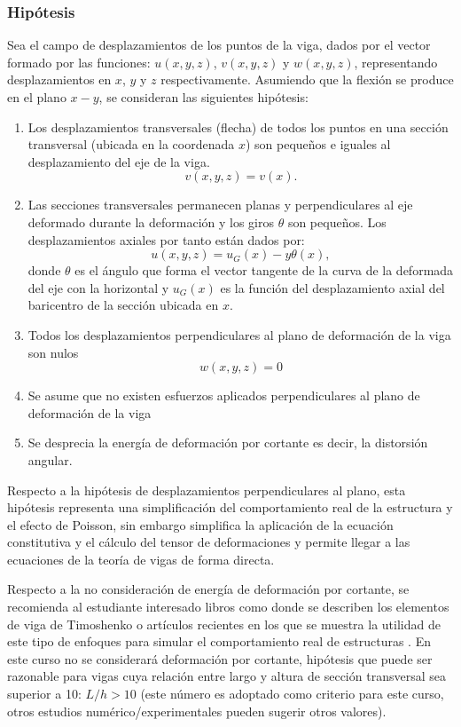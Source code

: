 \subsubsection{Hipótesis}
Sea el campo de desplazamientos de los puntos de la viga, dados por el vector formado por las funciones: $u(x,y,z)$, $v(x,y,z)$ y $w(x,y,z)$, representando desplazamientos en $x$, $y$ y $z$ respectivamente. %
%
Asumiendo que la flexión se produce en el plano $x-y$, se consideran las siguientes hipótesis:
%
\begin{enumerate}
	\item Los desplazamientos transversales (flecha) de todos los puntos en una sección transversal (ubicada en la coordenada $x$)  son pequeños e iguales al desplazamiento del eje de la viga.
	$$
	v(x,y,z) =  v(x).
	$$
	\item Las secciones transversales permanecen planas y perpendiculares al eje deformado durante la deformación y los giros $\theta$ son pequeños. %
	Los desplazamientos axiales por tanto están dados por:
	\begin{equation} \label{eqn:despaxi}
	u(x,y,z) = u_G(x) - y \theta(x),
	\end{equation}
	donde $\theta$ es el ángulo que forma el vector tangente de la curva de la deformada del eje con la horizontal y $u_G(x)$ es la función del desplazamiento axial del baricentro de la sección ubicada en $x$. 
	\item Todos los desplazamientos perpendiculares al plano de deformación de la viga son nulos
$$
w(x,y,z) = 0
$$
	\item Se asume que no existen esfuerzos aplicados perpendiculares al plano de deformación de la viga
	\item Se desprecia la energía de deformación por cortante es decir, la distorsión angular.
\end{enumerate}

Respecto a la hipótesis de desplazamientos perpendiculares al plano, esta hipótesis representa una simplificación del comportamiento real de la estructura y el efecto de Poisson, sin embargo simplifica la aplicación de la ecuación constitutiva y el cálculo del tensor de deformaciones y permite llegar a las ecuaciones de la teoría de vigas de forma directa.

Respecto a la no consideración de energía de deformación por cortante, se recomienda al estudiante interesado libros como \citep{Onate2013} donde se describen los elementos de viga de Timoshenko o  artículos recientes en los que se muestra la utilidad de este tipo de enfoques para simular el comportamiento real de estructuras \citep{Bui2014}. %
%
En este curso no se considerará deformación por cortante, hipótesis que puede ser razonable para vigas cuya relación entre largo y altura de sección transversal sea superior a 10: $L/h > 10$ (este número es adoptado como criterio para este curso, otros estudios numérico/experimentales pueden sugerir otros valores).

